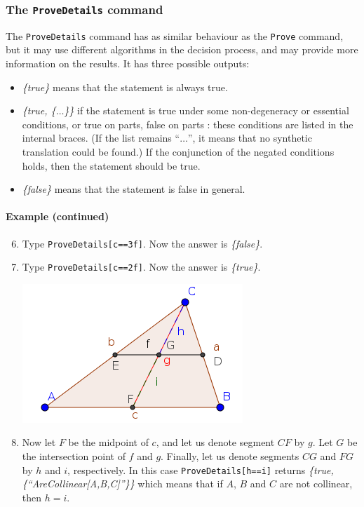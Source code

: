 \documentclass{article}
\begin{document}
\subsubsection{The \texttt{ProveDetails} command}
The \texttt{ProveDetails} command has as similar behaviour as the \texttt{Prove} command, but it may use different algorithms in the decision process, and may provide more information on the results. It has three possible outputs:
\begin{itemize}
    \item \textit{\{true\}} means that the statement is always true.
    \item \textit{\{true, \{$\ldots$\}\}} if the statement is true under some non-degeneracy \cite{Chou,RecioVelez} or essential \cite{KovacsRecioSolyomGecse} conditions, or true on parts, false on parts \cite{BotanaRecio2016,KovacsRecioVelez}: these conditions are listed in the internal braces. (If the list remains ``$\ldots$'', it means that no synthetic translation could be found.)  If the conjunction of the negated conditions holds, then the statement should be true.
    \item \textit{\{false\}} means that the statement is false in general.
\end{itemize}
\paragraph{Example (continued)}
\begin{enumerate}
\setcounter{enumi}{5}
    \item Type \texttt{ProveDetails[c==3f]}. Now the answer is \textit{\{false\}}.
    \item Type \texttt{ProveDetails[c==2f]}. Now the answer is \textit{\{true\}}.
\begin{center}
\includegraphics[scale=0.5]{ProveDetails-example-1}
\end{center}
    \item Now let $F$ be the midpoint of $c$, and let us denote segment $CF$ by $g$. Let $G$ be the intersection point of $f$ and $g$. Finally, let us denote segments $CG$ and $FG$ by $h$ and $i$, respectively. In this case \texttt{ProveDetails[h==i]} returns \textit{\{true,\{``AreCollinear[A,B,C]''\}\}} which means that if $A$, $B$ and $C$ are not collinear, then $h=i$.
\end{enumerate}
\end{document}
